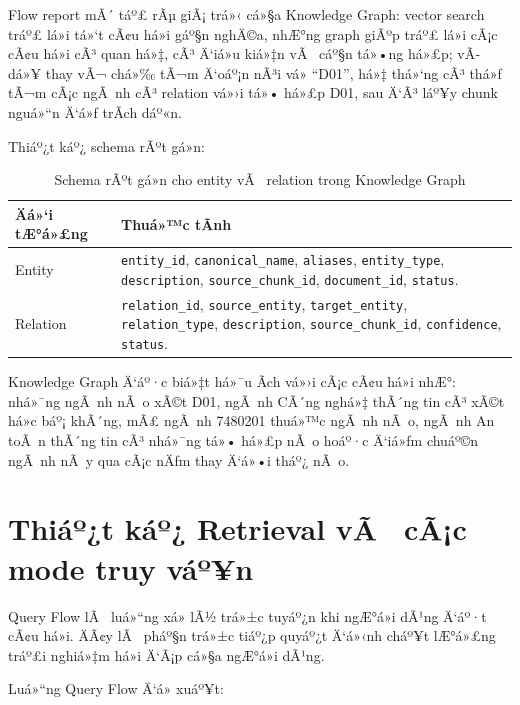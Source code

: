 ﻿\documentclass[12pt,a4paper]{report}
\begin{document}
Flow report mÃ´ táº£ rÃµ giÃ¡ trá»‹ cá»§a Knowledge Graph: vector search tráº£ lá»i tá»‘t cÃ¢u há»i gáº§n nghÄ©a, nhÆ°ng graph giÃºp tráº£ lá»i cÃ¡c cÃ¢u há»i cÃ³ quan há»‡, cÃ³ Ä‘iá»u kiá»‡n vÃ  cáº§n tá»•ng há»£p; vÃ­ dá»¥ thay vÃ¬ chá»‰ tÃ¬m Ä‘oáº¡n nÃ³i vá» ``D01'', há»‡ thá»‘ng cÃ³ thá»ƒ tÃ¬m cÃ¡c ngÃ nh cÃ³ relation vá»›i tá»• há»£p D01, sau Ä‘Ã³ láº¥y chunk nguá»“n Ä‘á»ƒ trÃ­ch dáº«n.

Thiáº¿t káº¿ schema rÃºt gá»n:

\begin{table}[H]
\centering
\begin{tabular}{|p{3.8cm}|p{9cm}|}
\hline
\textbf{Äá»‘i tÆ°á»£ng} & \textbf{Thuá»™c tÃ­nh} \\
\hline
Entity & \texttt{entity\_id}, \texttt{canonical\_name}, \texttt{aliases}, \texttt{entity\_type}, \texttt{description}, \texttt{source\_chunk\_id}, \texttt{document\_id}, \texttt{status}. \\
\hline
Relation & \texttt{relation\_id}, \texttt{source\_entity}, \texttt{target\_entity}, \texttt{relation\_type}, \texttt{description}, \texttt{source\_chunk\_id}, \texttt{confidence}, \texttt{status}. \\
\hline
\end{tabular}
\caption{Schema rÃºt gá»n cho entity vÃ  relation trong Knowledge Graph}
\label{tab:rag-kg-schema}
\end{table}

Knowledge Graph Ä‘áº·c biá»‡t há»¯u Ã­ch vá»›i cÃ¡c cÃ¢u há»i nhÆ°: nhá»¯ng ngÃ nh nÃ o xÃ©t D01, ngÃ nh CÃ´ng nghá»‡ thÃ´ng tin cÃ³ xÃ©t há»c báº¡ khÃ´ng, mÃ£ ngÃ nh 7480201 thuá»™c ngÃ nh nÃ o, ngÃ nh An toÃ n thÃ´ng tin cÃ³ nhá»¯ng tá»• há»£p nÃ o hoáº·c Ä‘iá»ƒm chuáº©n ngÃ nh nÃ y qua cÃ¡c nÄƒm thay Ä‘á»•i tháº¿ nÃ o.

\section{Thiáº¿t káº¿ Retrieval vÃ  cÃ¡c mode truy váº¥n}

Query Flow lÃ  luá»“ng xá»­ lÃ½ trá»±c tuyáº¿n khi ngÆ°á»i dÃ¹ng Ä‘áº·t cÃ¢u há»i. ÄÃ¢y lÃ  pháº§n trá»±c tiáº¿p quyáº¿t Ä‘á»‹nh cháº¥t lÆ°á»£ng tráº£i nghiá»‡m há»i Ä‘Ã¡p cá»§a ngÆ°á»i dÃ¹ng.

Luá»“ng Query Flow Ä‘á» xuáº¥t:
\end{document}
